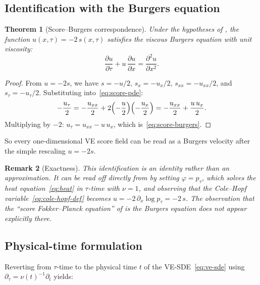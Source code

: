 \documentclass[11pt]{article}
\newtheorem{theorem}{Theorem}[section]
\newtheorem{remark}[theorem]{Remark}
\begin{document}
\subsection{Identification with the Burgers equation}\label{sec:sb:identification}

\begin{theorem}[Score--Burgers correspondence]\label{thm:score-burgers}
Under the hypotheses of , the function $u(x,\tau) = -2\,s(x,\tau)$ satisfies the viscous Burgers equation with unit viscosity:
\begin{equation}\label{eq:score-burgers}
  \frac{\partial u}{\partial \tau} + u\,\frac{\partial u}{\partial x}
  = \frac{\partial^2 u}{\partial x^2}.
\end{equation}
\end{theorem}

\begin{proof}
From $u = -2s$, we have $s = -u/2$, $s_x = -u_x/2$, $s_{xx} = -u_{xx}/2$, and $s_\tau = -u_\tau/2$.
Substituting into~\eqref{eq:score-pde}:
\[
  -\frac{u_\tau}{2}
  = -\frac{u_{xx}}{2} + 2\Bigl(-\frac{u}{2}\Bigr)\Bigl(-\frac{u_x}{2}\Bigr)
  = -\frac{u_{xx}}{2} + \frac{u\,u_x}{2}.
\]
Multiplying by $-2$: $u_\tau = u_{xx} - u\,u_x$, which is~\eqref{eq:score-burgers}.
\end{proof}

So every one-dimensional VE score field can be read as a Burgers velocity after the simple rescaling $u=-2s$.

\begin{remark}[Exactness]\label{rem:exactness}
This identification is an identity rather than an approximation. It can be read off directly from  by setting $\varphi = p_\tau$, which solves the heat equation~\eqref{eq:heat} in $\tau$-time with $\nu = 1$, and observing that the Cole--Hopf variable~\eqref{eq:cole-hopf-def} becomes $u = -2\,\partial_x \log p_\tau = -2\,s$. The observation that the ``score Fokker--Planck equation'' of \citet{lai2023fp} is the Burgers equation does not appear explicitly there.
\end{remark}

\subsection{Physical-time formulation}\label{sec:sb:physical}

Reverting from $\tau$-time to the physical time $t$ of the VE-SDE~\eqref{eq:ve-sde} using $\partial_\tau = \nu(t)^{-1}\partial_t$ yields:
\end{document}
